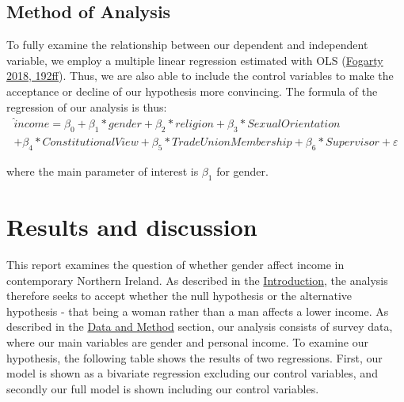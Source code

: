 \documentclass[
]{article}
\begin{document}
\hypertarget{method-of-analysis}{%
\subsection{Method of Analysis}\label{method-of-analysis}}

To fully examine the relationship between our dependent and independent
variable, we employ a multiple linear regression estimated with OLS
(\protect\hyperlink{ref-fogarty2018quantitative}{Fogarty 2018, 192ff}).
Thus, we are also able to include the control variables to make the
acceptance or decline of our hypothesis more convincing. The formula of
the regression of our analysis is thus: \begin{align*}
\hat income = \beta_0 + \beta_1*gender + \beta_2 * religion + \beta_3 * Sexual Orientation \\ + \beta_4 * Constitutional View +  \beta_5*Trade Union Membership + \beta_6*Supervisor + \varepsilon
\end{align*}

where the main parameter of interest is \(\beta_1\) for gender.

\pagebreak

\hypertarget{results-and-discussion}{%
\section{Results and discussion}\label{results-and-discussion}}

This report examines the question of whether gender affect income in
contemporary Northern Ireland. As described in the
\protect\hyperlink{introduction}{Introduction}, the analysis therefore
seeks to accept whether the null hypothesis or the alternative
hypothesis - that being a woman rather than a man affects a lower
income. As described in the \protect\hyperlink{data-and-method}{Data and
Method} section, our analysis consists of survey data, where our main
variables are gender and personal income. To examine our hypothesis, the
following table shows the results of two regressions. First, our model
is shown as a bivariate regression excluding our control variables, and
secondly our full model is shown including our control variables.
\end{document}
